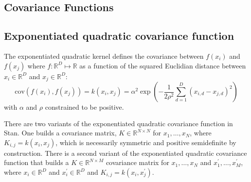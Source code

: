 \begin{description}
{\begin{description}
\section{Covariance Functions}\label{covariance.section}


\subsection{Exponentiated quadratic covariance function}


The exponentiated quadratic kernel defines the covariance between $f(x_i)$ and $f(x_j)$ where $f\colon \mathbb{R}^D \mapsto \mathbb{R}$ as a function of the squared Euclidian distance between $x_i \in \mathbb{R}^D$ and $x_j \in \mathbb{R}^D$: \[   \text{cov}(f(x_i), f(x_j)) = k(x_i, x_j) = \alpha^2 \exp \left( 	- \dfrac{1}{2\rho^2} \sum_{d=1}^D (x_{i,d} - x_{j,d})^2 \right) \] with $\alpha$ and $\rho$ constrained to be positive.


There are two variants of the exponentiated quadratic covariance function in Stan. One builds a covariance matrix, $K \in \mathbb{R}^{N \times N}$ for $x_1, \dots, x_N$, where $K_{i,j} = k(x_i, x_j)$, which is necessarily symmetric and positive semidefinite by construction. There is a second variant of the exponentiated quadratic covariance function that builds a $K \in \mathbb{R}^{N \times M}$ covariance matrix for $x_1, \dots, x_N$ and $x^\prime_1, \dots, x^\prime_M$, where $x_i \in \mathbb{R}^D$ and $x^\prime_i \in \mathbb{R}^D$ and $K_{i,j} = k(x_i, x^\prime_j)$.


\begin{description}       \end{description}



\end{description}}
\end{description}
